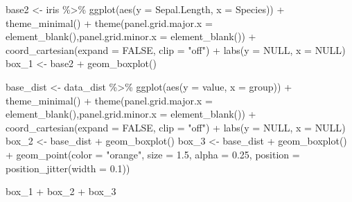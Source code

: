\documentclass[
  letterpaper,
]{book}
\newenvironment{Shaded}{\begin{snugshade}}{\end{snugshade}}
\newcommand{\AttributeTok}[1]{\textcolor[rgb]{0.40,0.45,0.13}{#1}}
\newcommand{\ConstantTok}[1]{\textcolor[rgb]{0.56,0.35,0.01}{#1}}
\newcommand{\FloatTok}[1]{\textcolor[rgb]{0.68,0.00,0.00}{#1}}
\newcommand{\FunctionTok}[1]{\textcolor[rgb]{0.28,0.35,0.67}{#1}}
\newcommand{\NormalTok}[1]{\textcolor[rgb]{0.00,0.23,0.31}{#1}}
\newcommand{\OtherTok}[1]{\textcolor[rgb]{0.00,0.23,0.31}{#1}}
\newcommand{\SpecialCharTok}[1]{\textcolor[rgb]{0.37,0.37,0.37}{#1}}
\newcommand{\StringTok}[1]{\textcolor[rgb]{0.13,0.47,0.30}{#1}}
\begin{document}
\begin{Shaded}
\begin{Highlighting}[]
\NormalTok{base2 }\OtherTok{\textless{}{-}}\NormalTok{ iris }\SpecialCharTok{\%\textgreater{}\%} \FunctionTok{ggplot}\NormalTok{(}\FunctionTok{aes}\NormalTok{(}\AttributeTok{y =}\NormalTok{ Sepal.Length, }\AttributeTok{x =}\NormalTok{ Species))  }\SpecialCharTok{+} \FunctionTok{theme\_minimal}\NormalTok{() }\SpecialCharTok{+} \FunctionTok{theme}\NormalTok{(}\AttributeTok{panel.grid.major.x  =} \FunctionTok{element\_blank}\NormalTok{(),}\AttributeTok{panel.grid.minor.x  =} \FunctionTok{element\_blank}\NormalTok{()) }\SpecialCharTok{+} 
  \FunctionTok{coord\_cartesian}\NormalTok{(}\AttributeTok{expand =} \ConstantTok{FALSE}\NormalTok{, }\AttributeTok{clip =} \StringTok{"off"}\NormalTok{) }\SpecialCharTok{+} \FunctionTok{labs}\NormalTok{(}\AttributeTok{y =} \ConstantTok{NULL}\NormalTok{, }\AttributeTok{x =} \ConstantTok{NULL}\NormalTok{)}
\NormalTok{box\_1 }\OtherTok{\textless{}{-}}\NormalTok{ base2 }\SpecialCharTok{+} \FunctionTok{geom\_boxplot}\NormalTok{()}

\NormalTok{base\_dist }\OtherTok{\textless{}{-}}\NormalTok{ data\_dist }\SpecialCharTok{\%\textgreater{}\%} \FunctionTok{ggplot}\NormalTok{(}\FunctionTok{aes}\NormalTok{(}\AttributeTok{y =}\NormalTok{ value, }\AttributeTok{x =}\NormalTok{ group))  }\SpecialCharTok{+} \FunctionTok{theme\_minimal}\NormalTok{() }\SpecialCharTok{+} \FunctionTok{theme}\NormalTok{(}\AttributeTok{panel.grid.major.x  =} \FunctionTok{element\_blank}\NormalTok{(),}\AttributeTok{panel.grid.minor.x  =} \FunctionTok{element\_blank}\NormalTok{()) }\SpecialCharTok{+} 
  \FunctionTok{coord\_cartesian}\NormalTok{(}\AttributeTok{expand =} \ConstantTok{FALSE}\NormalTok{, }\AttributeTok{clip =} \StringTok{"off"}\NormalTok{) }\SpecialCharTok{+} \FunctionTok{labs}\NormalTok{(}\AttributeTok{y =} \ConstantTok{NULL}\NormalTok{, }\AttributeTok{x =} \ConstantTok{NULL}\NormalTok{)}
\NormalTok{box\_2 }\OtherTok{\textless{}{-}}\NormalTok{ base\_dist }\SpecialCharTok{+} \FunctionTok{geom\_boxplot}\NormalTok{()}
\NormalTok{box\_3 }\OtherTok{\textless{}{-}}\NormalTok{ base\_dist }\SpecialCharTok{+} \FunctionTok{geom\_boxplot}\NormalTok{() }\SpecialCharTok{+} \FunctionTok{geom\_point}\NormalTok{(}\AttributeTok{color =} \StringTok{"orange"}\NormalTok{, }\AttributeTok{size =} \FloatTok{1.5}\NormalTok{, }\AttributeTok{alpha =} \FloatTok{0.25}\NormalTok{, }\AttributeTok{position =} \FunctionTok{position\_jitter}\NormalTok{(}\AttributeTok{width =} \FloatTok{0.1}\NormalTok{))}

\NormalTok{box\_1 }\SpecialCharTok{+}\NormalTok{ box\_2 }\SpecialCharTok{+}\NormalTok{ box\_3}
\end{Highlighting}
\end{Shaded}
\end{document}
